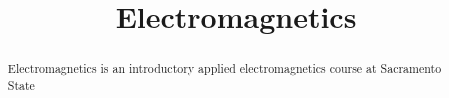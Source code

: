 \documentclass{xourse}
\title{Electromagnetics}
\begin{document}
  
\begin{abstract} %
Electromagnetics is an introductory applied electromagnetics course at Sacramento State
\end{abstract}  
\maketitle  
 
\end{document}
